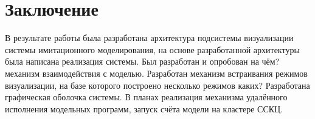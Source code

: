 \documentclass[a4paper,12pt]{extarticle}
\let\stdsection\section
\renewcommand\section{
    \newpage
    \stdsection
}
\begin{document}
\section{Заключение}

В результате работы была разработана архитектура подсистемы визуализации системы имитационного моделирования, на основе разработанной архитектуры была написана реализация системы. Был разработан и опробован на чём? механизм взаимодействия с моделью. Разработан механизм встраивания режимов визуализации, на базе которого построено несколько режимов каких? Разработана графическая оболочка системы.
В планах реализация механизма удалённого исполнения модельных программ, запуск счёта модели на кластере ССКЦ.
\end{document}
